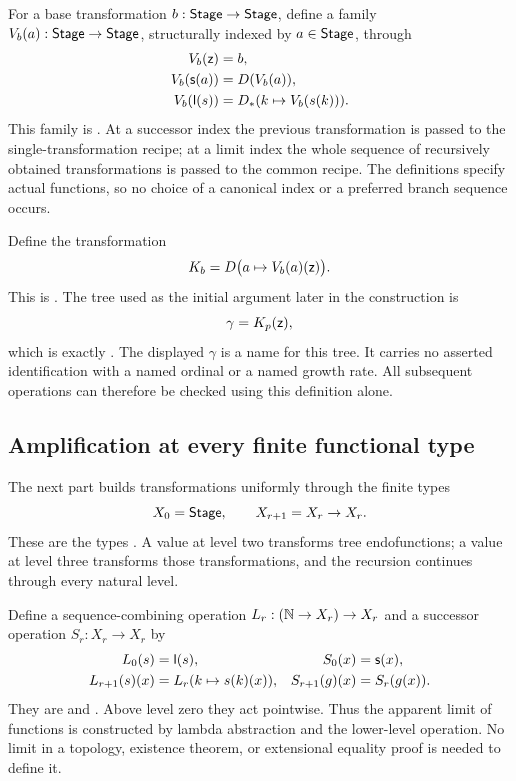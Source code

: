For a base transformation \(b:\mathsf{Stage}\to\mathsf{Stage}\), define a family
\(V_b(a):\mathsf{Stage}\to\mathsf{Stage}\), structurally indexed by \(a\in\mathsf{Stage}\), through
\begin{align*}
 V_b(\mathsf z)&=b,\\
 V_b(\mathsf s(a))&=D(V_b(a)),\\
 V_b(\mathsf l(s))&=D_*(k\mapsto V_b(s(k))).
\end{align*}
This family is . At a successor index the previous
transformation is passed to the single-transformation recipe; at a limit
index the whole sequence of recursively obtained transformations is
passed to the common recipe. The definitions specify actual functions,
so no choice of a canonical index or a preferred branch sequence occurs.

Define the transformation
\[
 K_b=D\bigl(a\mapsto V_b(a)(\mathsf z)\bigr).
\]
This is . The tree used as the initial argument
later in the construction is
\begin{equation}\label{eq:gamma-tree}
                    \gamma=K_p(\mathsf z),
\end{equation}
which is exactly . The displayed \(\gamma\) is a name
for this tree. It carries no asserted identification with a named ordinal
or a named growth rate. All subsequent operations can therefore be
checked using this definition alone.

\subsection{Amplification at every finite functional type}

The next part builds transformations uniformly through the finite types
\[
                    X_0=\mathsf{Stage},\qquad X_{r+1}=X_r\to X_r.
\]
These are the types . A value at level two transforms
tree endofunctions; a value at level three transforms those transformations,
and the recursion continues through every natural level.

Define a sequence-combining operation \(L_r:(\mathbb N\to X_r)\to X_r\)
and a successor operation \(S_r:X_r\to X_r\) by
\begin{align*}
 L_0(s)&=\mathsf l(s),
 &S_0(x)&=\mathsf s(x),\\
 L_{r+1}(s)(x)&=L_r(k\mapsto s(k)(x)),
 &S_{r+1}(g)(x)&=S_r(g(x)).
\end{align*}
They are  and . Above level zero they
act pointwise. Thus the apparent limit of functions is constructed by
lambda abstraction and the lower-level operation. No limit in a topology,
existence theorem, or extensional equality proof is needed to define it.

